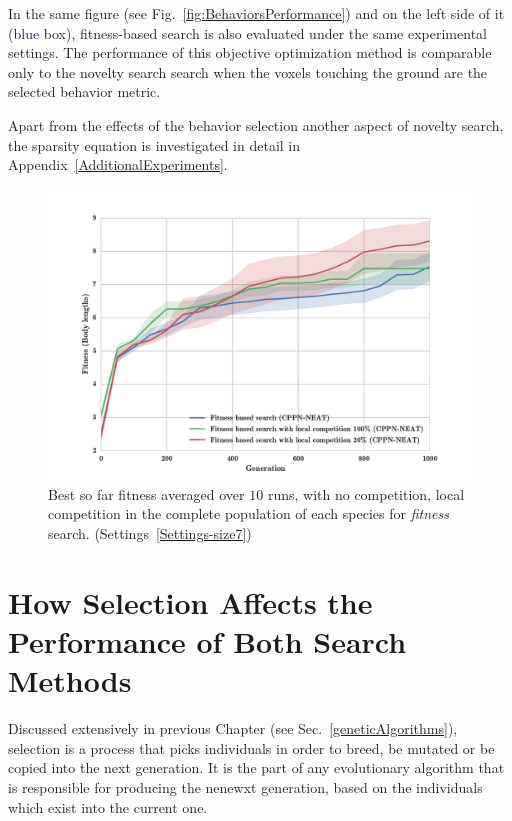 In the same figure (see Fig.~\ref{fig:BehaviorsPerformance}) and on the left side of it (\textcolor{MidnightBlue}{blue} box), fitness-based search is also evaluated under the same experimental settings. The performance of this objective optimization method is comparable only to the novelty search search when the voxels touching the ground are the selected behavior metric.

Apart from the effects of the behavior selection another aspect of novelty search, the sparsity equation is investigated in detail in Appendix~\ref{AdditionalExperiments}.




\begin{figure}[t!]
\centering
\includegraphics[width=1.0\textwidth]{../Figures/Results/fitComp100_20percent.pdf}
\caption{Best so far fitness averaged over $10$ runs, with no competition, local competition in the complete population of each species for \emph{fitness} search. (Settings~\ref{Settings-size7})}
\label{fig:fitComp100_20percent}
\end{figure}

\section{How Selection Affects the Performance of Both Search Methods}

Discussed extensively in previous Chapter (see Sec.~\ref{geneticAlgorithms}), selection is a process that picks individuals in order to breed, be mutated or be copied into the next generation. It is the part of any evolutionary algorithm that is responsible for producing the nenewxt generation, based on the individuals which exist into the current one.


